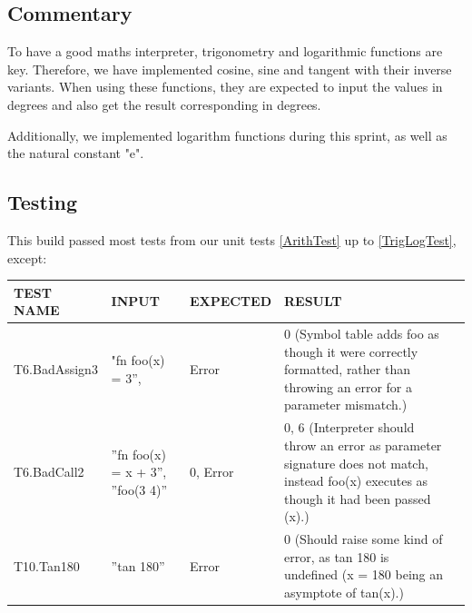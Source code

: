 \documentclass[a4paper, oneside, 11pt]{report}
\begin{document}
    \subsection{Commentary}
    To have a good maths interpreter, trigonometry and logarithmic functions are key. Therefore, we have implemented cosine, sine and tangent with their inverse variants. When using these functions, they are expected to input the values in degrees and also get the result corresponding in degrees.

    Additionally, we implemented logarithm functions during this sprint, as well as the natural constant "e".

    \subsection{Testing}
    This build passed most tests from our unit tests \ref{ArithTest} up to \ref{TrigLogTest}, except:
    \begin{center}
        \begin{tabular}{|p{1.5in}|p{1.5in}|p{1in}|p{1.6in}|p{2.4in}|}
            \hline
            TEST NAME & INPUT & EXPECTED & RESULT \\
            \hline
            T6.BadAssign3 & "fn foo(x) = 3”, & Error & 0 (Symbol table adds foo as though it were correctly formatted, rather than throwing an error for a parameter mismatch.) \\
            \hline
            T6.BadCall2 & ”fn foo(x) = x + 3”, ”foo(3 4)” & 0, Error & 0, 6 (Interpreter should throw an error as parameter signature does not match, instead foo(x) executes as though it had been passed (x).) \\
            \hline
            T10.Tan180 & ”tan 180” & Error & 0 (Should raise some kind of error, as tan 180 is undefined (x = 180 being an asymptote of tan(x).) \\
            \hline
        \end{tabular}
    \end{center}

    \clearpage
\end{document}
